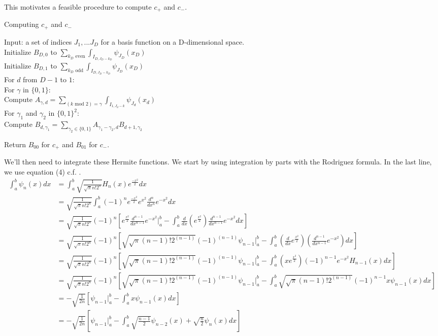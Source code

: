 \documentclass{article}
\begin{document}
This motivates a feasible procedure to compute $c_+$ and $c_-$. 
\begin{algorithm}[h]
\caption{Computing $c_+$ and $c_-$}
Input: a set of indices $J_1, ... J_D$ for a basis function on a D-dimensional space.\\
Initialize $B_{D,0}$ to $\sum_{k_D \text{ even}} \int_{I_{D,J_D-k_D}}  \psi_{J_D}(x_D)$\\
Initialize $B_{D,1}$ to $\sum_{k_D \text{ odd}} \int_{I_{D,J_D-k_D}}  \psi_{J_D}(x_D)$\\
For $d$ from $D-1$ to $1$:\\
\Indp
For $\gamma$ in $\{0,1\}$:\\
\Indp
Compute $A_{\gamma, d} = \sum_{\left(k \text{ mod } 2\right) = \gamma} \int_{I_{1,J_d-k}}\psi_{J_d}(x_d)$\\
\Indm
For $\gamma_1$ and $\gamma_2$ in $\{0,1\}^2$:\\
\Indp
Compute $B_{d,\gamma_1} =\sum_{ \gamma_2 \in \{0,1\}}  A_{ \gamma_1 - \gamma_2, {d}}
B_{{d}+1,\gamma_2}$\\
\Indm
\Indm

Return $B_{00}$ for $c_+$ and $B_{01}$ for $c_-$. 
\Indp
\Indm
\end{algorithm}

We'll then need to integrate these Hermite functions. We start by using integration by parts with the Rodriguez formula. In the last line, we use equation (4) c.f. \cite{Bunck:2009kq}.
\begin{align*}
\int_a^b \psi_n(x)dx &=\int_a^b \sqrt{\frac{1}{\sqrt{\pi}n!2^n}} H_n(x)e^{\frac{-x^2}{2}} dx \\
&=\sqrt{\frac{1}{\sqrt{\pi}n!2^n}}\int_a^b (-1)^ne^{\frac{-x^2}{2}}e^{x^2} \frac{d^n}{dx^n}e^{-x^2}dx\\
&=\sqrt{\frac{1}{\sqrt{\pi}n!2^n}}(-1)^n \left[ e^{\frac{x^2}{2}} \frac{d^{n-1}}{dx^{n-1}}e^{-x^2} \biggr\rvert_a^b - \int_a^b \frac{d}{dx}(e^{\frac{x^2}{2}}) \frac{d^{n-1}}{dx^{n-1}} e^{-x^2}dx\right] \\
&=\sqrt{\frac{1}{\sqrt{\pi}n!2^n}}(-1)^n \left[ \sqrt{{\sqrt{\pi}{(n-1)}!2^{(n-1)}}}(-1)^{(n-1)}\psi_{n-1} \biggr\rvert_a^b - \int_a^b (\frac{d}{dx}e^{\frac{x^2}{2}}) (\frac{d^{n-1}}{dx^{n-1}} e^{-x^2})dx\right] \\
&=\sqrt{\frac{1}{\sqrt{\pi}n!2^n}}(-1)^n \left[ \sqrt{{\sqrt{\pi}{(n-1)}!2^{(n-1)}}}(-1)^{(n-1)}\psi_{n-1} \biggr\rvert_a^b - \int_a^b (xe^{\frac{x^2}{2}}) (-1)^{n-1}e^{-x^2}H_{n-1}(x)dx\right] \\
&=\sqrt{\frac{1}{\sqrt{\pi}n!2^n}}(-1)^n \left[ \sqrt{{\sqrt{\pi}{(n-1)}!2^{(n-1)}}}(-1)^{(n-1)}\psi_{n-1} \biggr\rvert_a^b - \int_a^b \sqrt{{\sqrt{\pi}{(n-1)}!2^{(n-1)}}}(-1)^{n-1}x\psi_{n-1}(x)dx\right] \\
&=-\sqrt{\frac{1}{2n}} \left[ \psi_{n-1} \biggr\rvert_a^b - \int_a^b x\psi_{n-1}(x)dx\right] \\
&=-\sqrt{\frac{1}{2n}} \left[ \psi_{n-1} \biggr\rvert_a^b - \int_a^b \sqrt{\frac{n-1}{2}}\psi_{n-2}(x)+\sqrt{\frac{n}{2}}\psi_{n}(x)dx\right] \\
\end{align*}
\end{document}
